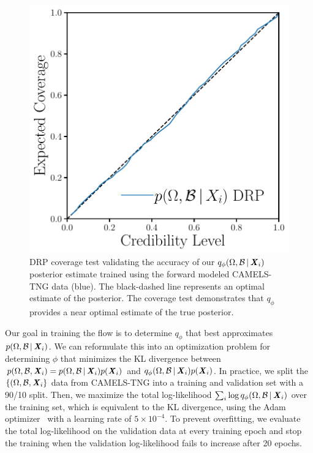 \begin{figure}[ht]
\vskip 0.2in
\begin{center}
    \centerline{\includegraphics[width=0.6\columnwidth]{figs/tarp_p_omega_x.pdf}}
    \caption{DRP coverage test validating the accuracy of our 
    $q_{\phi}(\Omega, \mathcal{B}\,|\, {\textbf{\textit{X}}_i})$ posterior estimate trained
    using the forward modeled CAMELS-TNG data (blue).
    The black-dashed line represents an optimal estimate of the posterior.
    The coverage test demonstrates that $q_\phi$ provides a near optimal
    estimate of the true posterior.
    }\label{fig:tarp}
\end{center}
\vskip -0.2in
\end{figure}

Our goal in training the flow is to determine $q_\phi$ that best approximates 
$p(\Omega, \mathcal{B}\,|\, {\textbf{\textit{X}}_i})$. 
We can reformulate this into an optimization problem for determining $\phi$
that minimizes the KL divergence between 
$p(\Omega, \mathcal{B}, {\textbf{\textit{X}}_i}) = p(\Omega, \mathcal{B}\,|\, {\textbf{\textit{X}}_i})
 p({\textbf{\textit{X}}_i})$ and
$q_\phi(\Omega, \mathcal{B}\,|\, {\textbf{\textit{X}}_i}) p({\textbf{\textit{X}}_i})$.
In practice, we split the $\{(\Omega, \mathcal{B}, {\textbf{\textit{X}}_i}\}$ data from
CAMELS-TNG into a training and validation set with a 90/10 split.
Then, we maximize the total log-likelihood 
$\sum_i \log q_{\phi}(\Omega, \mathcal{B}\,|\, {\textbf{\textit{X}}_i})$ over the 
training set, which is equivalent to the KL divergence, using the {\sc Adam} 
optimizer~\citep{kingma2017} with a learning rate of $5\times10^{-4}$. 
To prevent overfitting, we evaluate the total log-likelihood on the validation
data at every training epoch and stop the training when the validation 
log-likelihood fails to increase after 20 epochs.  



